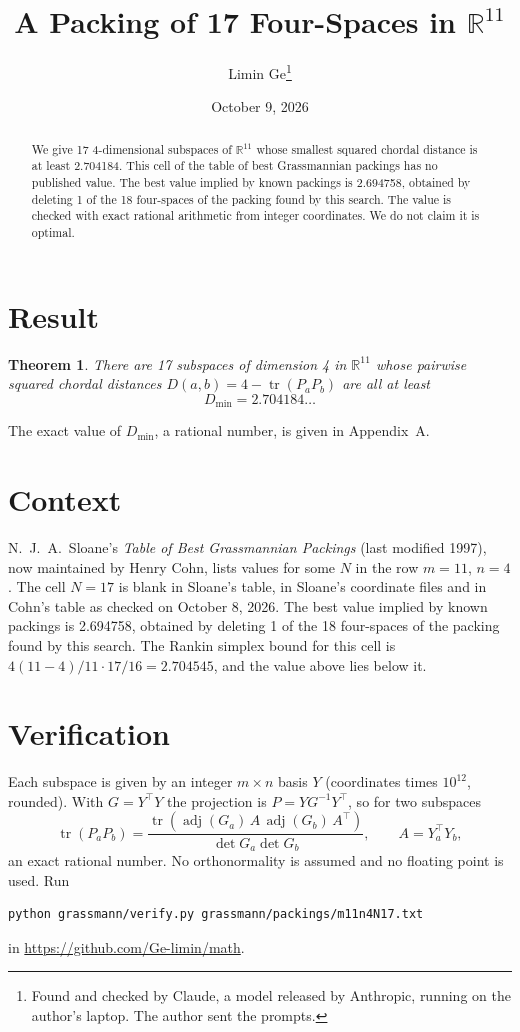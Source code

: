 \documentclass[11pt,a4paper]{article}
\title{A Packing of 17 Four-Spaces in $\mathbb{R}^{11}$}
\author{Limin Ge\thanks{Found and checked by Claude, a model released by Anthropic, running on the author's laptop. The author sent the prompts.}}
\date{October 9, 2026}
\newtheorem*{theorem}{Theorem}
\begin{document}
\maketitle
\begin{abstract}
We give 17 4-dimensional subspaces of $\mathbb{R}^{11}$ whose smallest squared chordal distance is at least 2.704184. This cell of the table of best Grassmannian packings has no published value. The best value implied by known packings is 2.694758, obtained by deleting 1 of the 18 four-spaces of the packing found by this search. The value is checked with exact rational arithmetic from integer coordinates. We do not claim it is optimal.
\end{abstract}

\section{Result}
\begin{theorem}
There are 17 subspaces of dimension 4 in $\mathbb{R}^{11}$ whose pairwise squared chordal distances $D(a,b) = 4 - \operatorname{tr}(P_aP_b)$ are all at least
\[ D_{\min} = 2.704184\ldots \]
\end{theorem}
The exact value of $D_{\min}$, a rational number, is given in Appendix~A.


\section{Context}
N.~J.~A.~Sloane's \emph{Table of Best Grassmannian Packings} (last modified 1997), now maintained by Henry Cohn, lists values for some $N$ in the row $m=11$, $n=4$. The cell $N=17$ is blank in Sloane's table, in Sloane's coordinate files and in Cohn's table as checked on October 8, 2026. The best value implied by known packings is 2.694758, obtained by deleting 1 of the 18 four-spaces of the packing found by this search. The Rankin simplex bound for this cell is $4(11-4)/11\cdot 17/16 = 2.704545$, and the value above lies below it.


\section{Verification}
Each subspace is given by an integer $m\times n$ basis $Y$ (coordinates times $10^{12}$, rounded). With $G=Y^\top Y$ the projection is $P=YG^{-1}Y^\top$, so for two subspaces
\[ \operatorname{tr}(P_aP_b)=\frac{\operatorname{tr}(\operatorname{adj}(G_a)\,A\,\operatorname{adj}(G_b)\,A^\top)}{\det G_a\det G_b},\qquad A=Y_a^\top Y_b, \]
an exact rational number. No orthonormality is assumed and no floating point is used. Run
\begin{verbatim}
python grassmann/verify.py grassmann/packings/m11n4N17.txt
\end{verbatim}
in \url{https://github.com/Ge-limin/math}.
\end{document}
